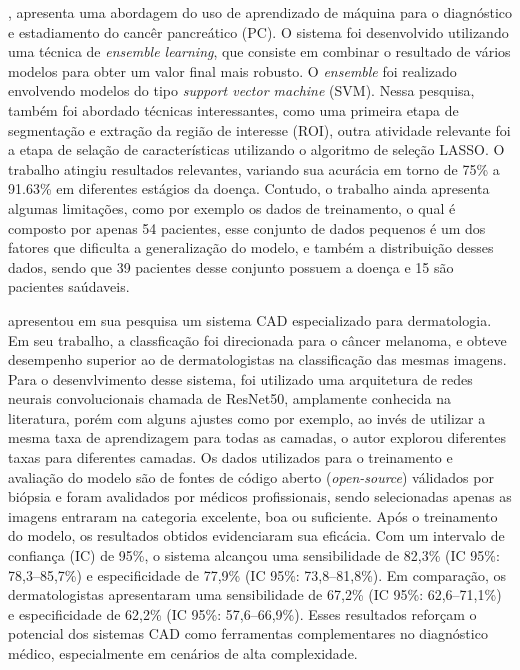 , apresenta uma abordagem do uso de aprendizado de máquina para o diagnóstico e estadiamento do cancêr pancreático (PC). O sistema foi desenvolvido utilizando uma técnica de \textit{ensemble learning}, que consiste em combinar o resultado de vários modelos para obter um valor final mais robusto. O \textit{ensemble} foi realizado envolvendo modelos do tipo \textit{support vector machine} (SVM). Nessa pesquisa, também foi abordado técnicas interessantes, como uma primeira etapa de segmentação e extração da região de interesse (ROI), outra atividade relevante foi a etapa de selação de características utilizando o algoritmo de seleção LASSO. O trabalho atingiu resultados relevantes, variando sua acurácia em torno de 75\% a 91.63\% em diferentes estágios da doença. Contudo, o trabalho ainda apresenta algumas limitações, como por exemplo os dados de treinamento, o qual é composto por apenas 54 pacientes, esse conjunto de dados pequenos é um dos fatores que dificulta a generalização do modelo, e também a distribuição desses dados, sendo que 39 pacientes desse conjunto possuem a doença e 15 são pacientes saúdaveis.

 apresentou em sua pesquisa um sistema CAD especializado para dermatologia. Em seu trabalho, a classficação foi direcionada para o câncer melanoma, e obteve desempenho superior ao de dermatologistas na classificação das mesmas imagens. Para o desenvlvimento desse sistema, foi utilizado uma arquitetura de redes neurais convolucionais chamada de ResNet50, amplamente conhecida na literatura, porém com alguns ajustes como por exemplo, ao invés de utilizar a mesma taxa de aprendizagem para todas as camadas, o autor explorou diferentes taxas para diferentes camadas. Os dados utilizados para o treinamento e avaliação do modelo são de fontes de código aberto (\textit{open-source}) válidados por biópsia e foram avalidados por médicos profissionais, sendo selecionadas apenas as imagens entraram na categoria excelente, boa ou suficiente. Após o treinamento do modelo, os resultados obtidos evidenciaram sua eficácia. Com um intervalo de confiança (IC) de 95\%, o sistema alcançou uma sensibilidade de 82,3\% (IC 95\%: 78,3–85,7\%) e especificidade de 77,9\% (IC 95\%: 73,8–81,8\%). Em comparação, os dermatologistas apresentaram uma sensibilidade de 67,2\% (IC 95\%: 62,6–71,1\%) e especificidade de 62,2\% (IC 95\%: 57,6–66,9\%). Esses resultados reforçam o potencial dos sistemas CAD como ferramentas complementares no diagnóstico médico, especialmente em cenários de alta complexidade.

